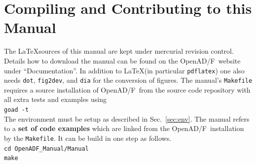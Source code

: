 \documentclass{book}
\newcommand{\OpenADF}{OpenAD/F}
\newcommand{\refsec}[1]{{Sec.~\ref{#1}}}
\begin{document}
\chapter{Compiling and Contributing to this Manual}\label{sec:compilingManual}
The \LaTeX  sources of this manual are kept under 
mercurial revision control. Details how to download 
the manual can be found on the \OpenADF\ website under ``Documentation''.  
In addition to \LaTeX  (in particular \lstinline{pdflatex}) 
one also needs \lstinline{dot}, \lstinline{fig2dev}, and 
\lstinline{dia} for the conversion of figures. 
The manual's \lstinline{Makefile} requires a source installation of \OpenADF\
from the source code repository with all extra tests and examples using \\[1ex]
\hspace*{.3cm}\lstinline{goad -t}\\[1ex]
The environment must be setup as described in \refsec{sec:env}.
The manual refers to a {\bf set of code examples} which are 
linked from the \OpenADF\ installation by the \lstinline{Makefile}.
It can be build in one step as follows.\\[1ex]
\hspace*{.3cm}\lstinline{cd OpenADF_Manual/Manual}\\
\hspace*{.3cm}\lstinline{make}\\[1ex]
   
\end{document}
